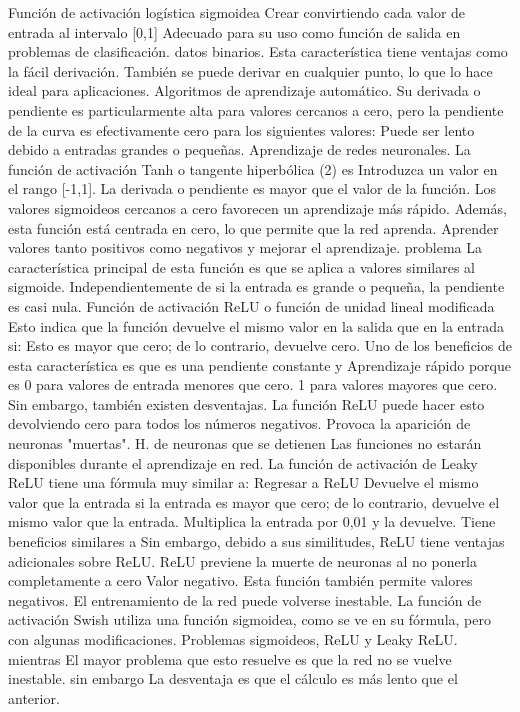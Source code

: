 Función de activación logística sigmoidea 
Crear convirtiendo cada valor de entrada al intervalo [0,1] 
Adecuado para su uso como función de salida en problemas de clasificación. 
datos binarios. Esta característica tiene ventajas como la fácil derivación. 
También se puede derivar en cualquier punto, lo que lo hace ideal para aplicaciones. 
Algoritmos de aprendizaje automático. Su derivada o pendiente es particularmente alta para valores cercanos a cero, pero la pendiente de la curva es efectivamente cero para los siguientes valores: 
Puede ser lento debido a entradas grandes o pequeñas. 
 Aprendizaje de redes neuronales. La función de activación Tanh o tangente hiperbólica (2) es 
 Introduzca un valor en el rango [-1,1]. La derivada o pendiente es mayor que el valor de la función. 
Los valores sigmoideos cercanos a cero favorecen un aprendizaje más rápido. 
Además, esta función está centrada en  cero, lo que permite que la red aprenda. 
Aprender valores tanto positivos como negativos y mejorar el aprendizaje.  problema 
La característica principal de esta función es que se aplica a valores similares al sigmoide. 
 Independientemente de si la entrada es grande o pequeña, la pendiente es casi nula. 
 Función de activación ReLU o función de unidad lineal modificada 
 Esto indica que la función devuelve el mismo valor en la salida que en la entrada si: 
Esto es mayor que cero; de lo contrario, devuelve cero. Uno de los beneficios de esta característica es que 
es una pendiente constante y  
Aprendizaje rápido porque es 0 para valores de entrada menores que cero. 
1 para valores mayores que cero. Sin embargo, también existen desventajas. 
La función ReLU puede hacer esto devolviendo cero para todos los números negativos. 
Provoca la aparición de neuronas "muertas". H. de neuronas que se detienen 
Las funciones no estarán disponibles durante el aprendizaje en red. 
La función de activación de Leaky ReLU tiene una fórmula muy similar a: 
 Regresar a ReLU 
Devuelve el mismo valor que la entrada si la entrada es mayor que cero; de lo contrario, devuelve el mismo valor que la entrada. 
Multiplica la entrada  por 0,01 y la devuelve. Tiene beneficios similares a 
 Sin embargo, debido a sus similitudes, ReLU tiene ventajas adicionales sobre ReLU. 
ReLU previene la muerte de neuronas al no ponerla completamente a cero  
Valor negativo. Esta función también permite valores negativos.  
El entrenamiento de la red puede volverse inestable. 
La función de activación Swish utiliza una función sigmoidea, como se ve en su fórmula, pero con algunas modificaciones. 
Problemas sigmoideos, ReLU y  Leaky ReLU. mientras 
El mayor problema que esto resuelve es que la red no se vuelve inestable. sin embargo 
La desventaja es que el cálculo es más lento que el anterior. 


